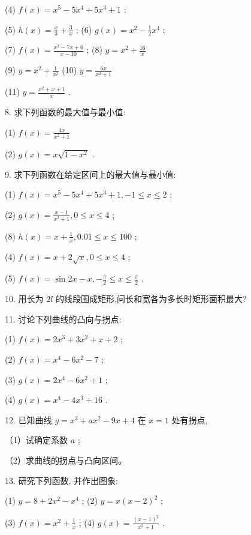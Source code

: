 \documentclass[lang=cn,newtx,12pt,scheme=chinese]{elegantbook}
\begin{document}
(4) \(f\left( x\right) = {x}^{5} - 5{x}^{4} + 5{x}^{3} + 1\) ;

(5) \(h\left( x\right) = \frac{x}{3} + \frac{3}{x}\) ; (6) \(g\left( x\right) = {x}^{2} - \frac{1}{2}{x}^{4}\) ;

(7) \(f\left( x\right) = \frac{{x}^{2} - {7x} + 6}{x - {10}}\) ; (8) \(y = {x}^{2} + \frac{16}{x}\)

(9) \(y = {x}^{2} + \frac{1}{{x}^{2}}\) (10) \(y = \frac{6x}{{x}^{2} + 1}\)

(11) \(y = \frac{{x}^{2} + x + 1}{x}\) .

8. 求下列函数的最大值与最小值:

(1) \(f\left( x\right) = \frac{4x}{{x}^{2} + 1}\)

(2) \(g\left( x\right) = x\sqrt{1 - {x}^{2}}\) .

9. 求下列函数在给定区间上的最大值与最小值:

(1) \(f\left( x\right) = {x}^{5} - 5{x}^{4} + 5{x}^{3} + 1, - 1 \leq x \leq 2\) ;

(2) \(g\left( x\right) = \frac{x - 1}{{x}^{2} + 1},0 \leq x \leq 4\) ;

(8) \(h\left( x\right) = x + \frac{1}{x},{0.01} \leq x \leq {100}\) ;

(4) \(f\left( x\right) = x + 2\sqrt{x},0 \leq x \leq 4\) ;

(5) \(f\left( x\right) = \sin {2x} - x, - \frac{\pi }{2} \leq x \leq \frac{\pi }{2}\) .

10. 用长为 \({2l}\) 的线段围成矩形,问长和宽各为多长时矩形面积最大?

11. 讨论下列曲线的凸向与拐点:

(1) \(f\left( x\right) = 2{x}^{3} + 3{x}^{2} + x + 2\) ;

(2) \(f\left( x\right) = {x}^{4} - 6{x}^{2} - 7\) ;

(3) \(g\left( x\right) = 2{x}^{4} - 6{x}^{2} + 1\) ;

(4) \(g\left( x\right) = {x}^{4} - 4{x}^{3} + {16}\) .

12. 已知曲线 \(y = {x}^{3} + a{x}^{2} - {9x} + 4\) 在 \(x = 1\) 处有拐点,

（1）试确定系数 \(a\) ;

（2）求曲线的拐点与凸向区间。

13. 研究下列函数, 并作出图象:

(1) \(y = 8 + 2{x}^{2} - {x}^{4}\) ; (2) \(y = x{\left( x - 2\right) }^{2}\) ;

(3) \(f\left( x\right) = {x}^{2} + \frac{1}{x}\) ; (4) \(g\left( x\right) = \frac{{\left( x - 1\right) }^{2}}{{x}^{2} + 1}\) .
\end{document}
